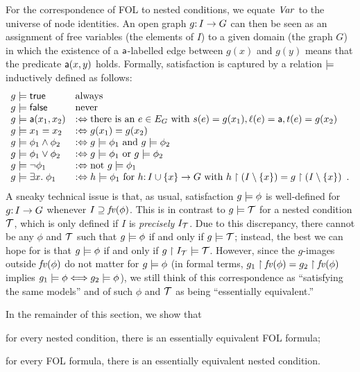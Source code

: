 For the correspondence of FOL to nested conditions, we equate $\mathit{Var}$ to the universe of node identities. An open graph $g{:}\, I\rightarrow G$ can then be seen as an assignment of free variables (the elements of $I$) to a given domain (the graph $G$) in which the existence of a $\mathsf{a}$-labelled edge between $g(x)$ and $g(y)$ means that the predicate $\mathsf{a}(x,y)$ holds. Formally, satisfaction is captured by a relation $\models$ inductively defined as follows:
%
\[\begin{array}{ll}
g\models \mathsf{true} & \text{always} \\
g\models \mathsf{false} & \text{never} \\
g\models \mathsf{a}(x_1,x_2) & :\Leftrightarrow \text{there is an } e\in E_G \text{ with } s(e)=g(x_1), \ell(e)=\mathsf{a}, t(e)=g(x_2) \\
g\models x_1=x_2 & :\Leftrightarrow g(x_1)=g(x_2) \\
g\models \phi_1\wedge \phi_2 & :\Leftrightarrow g\models \phi_1 \text{ and } g\models \phi_2 \\
g\models \phi_1\vee \phi_2 & :\Leftrightarrow g\models \phi_1 \text{ or } g\models \phi_2 \\
g\models \neg\phi_1 & :\Leftrightarrow \text{not } g\models \phi_1 \\
g\models \exists x.\; \phi_1  & :\Leftrightarrow h\models \phi_1 \text{ for } h{:}\, I\cup\{{x}\}\rightarrow G \text{ with } h\restriction (I\setminus \{{x}\}) =g\restriction (I\setminus \{{x}\}) \enspace.
\end{array}\]
%
A sneaky technical issue is that, as usual, satisfaction $g\models\phi$ is well-defined for $g{:}\, I\rightarrow G$ whenever $I\supseteq\mathit{fv}(\phi)$. This is in contrast to $g\models{\mathcal{T}}$ for a nested condition ${\mathcal{T}}$, which is only defined if $I$ is \emph{precisely} $I_{\mathcal{T}}$. Due to this discrepancy, there cannot be any $\phi$ and ${\mathcal{T}}$ such that $g\models \phi$ if and only if $g\models {\mathcal{T}}$; instead, the best we can hope for is that $g\models \phi$ if and only if $g\restriction I_{\mathcal{T}} \models {\mathcal{T}}$. However, since the $g$-images outside $\mathit{fv}(\phi)$ do not matter for $g\models \phi$ (in formal terms, $g_1\restriction \mathit{fv}(\phi)=g_2\restriction \mathit{fv}(\phi)$ implies $g_1\models\phi \Longleftrightarrow g_2\models\phi$), we still think of this correspondence as ``satisfying the same models'' and of such $\phi$ and ${\mathcal{T}}$ as being ``essentially equivalent.''

In the remainder of this section, we show that
%
\begin{inumerate}
\item for every nested condition, there is an essentially equivalent FOL formula;
\item for every FOL formula, there is an essentially equivalent nested condition.
\end{inumerate}
%

